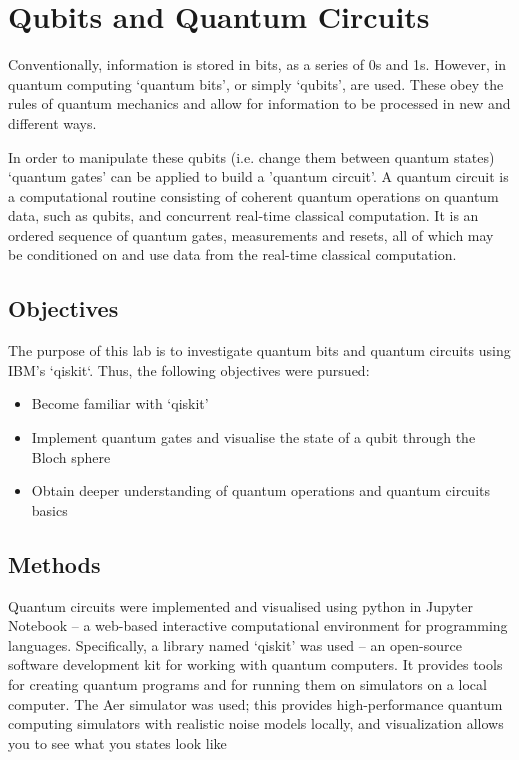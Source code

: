 \renewcommand{\chaptername}{March 8th: Lab}
\chapter{Qubits and Quantum Circuits}

Conventionally, information is stored in bits, as a series of 0s and 1s. However, in quantum computing `quantum bits', or simply `qubits', are used. These obey the rules of quantum mechanics and allow for information to be processed in new and different ways.

In order to manipulate these qubits (i.e. change them between quantum states) `quantum gates' can be applied to build a 'quantum circuit'. A quantum circuit is a computational routine consisting of coherent quantum operations on quantum data, such as qubits, and concurrent real-time classical computation. It is an ordered sequence of quantum gates, measurements and resets, all of which may be conditioned on and use data from the real-time classical computation.

\section{Objectives}
The purpose of this lab is to investigate quantum bits and quantum circuits using IBM's `qiskit`. Thus, the following objectives were pursued:
\begin{itemize}
    \item Become familiar with `qiskit'
    \item Implement quantum gates and visualise the state of a qubit through the Bloch sphere
    \item Obtain deeper understanding of quantum operations and quantum circuits basics
\end{itemize}

\section{Methods}
Quantum circuits were implemented and visualised using python in Jupyter Notebook -- a web-based interactive computational environment for programming languages. Specifically, a library named `qiskit' was used -- an open-source software development kit for working with quantum computers. It provides tools for creating quantum programs and for running them on simulators on a local computer. The Aer simulator was used; this provides high-performance quantum computing simulators with realistic noise models locally, and visualization allows you to see what you states look like

